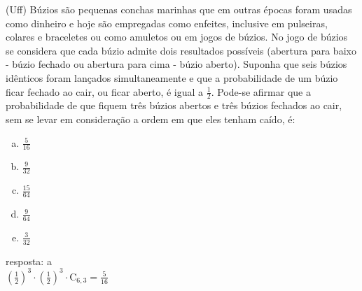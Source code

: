 \begin{ex}
 (Uff) Búzios são pequenas conchas marinhas   que     em outras épocas foram usadas como dinheiro e hoje são empregadas como enfeites, inclusive em pulseiras, colares e braceletes ou como amuletos ou em jogos de búzios. No jogo de búzios se considera que cada búzio admite dois resultados possíveis (abertura para baixo - búzio fechado ou abertura para cima - búzio aberto).
Suponha que seis búzios idênticos foram lançados simultaneamente e que a probabilidade de um búzio ficar fechado ao cair, ou ficar aberto, é igual a $\frac{1}{2}$.
Pode-se afirmar que a probabilidade de que fiquem três búzios abertos e três búzios fechados ao cair, sem se levar em consideração a ordem em que eles tenham caído, é:
    \begin{enumerate}[(a)]
    \item $\frac{5}{16}$
    \item $\frac{9}{32}$
    \item $\frac{15}{64}$
    \item $\frac{9}{64}$
    \item $\frac{3}{32}$
    \end{enumerate}
      \begin{sol}
      resposta: a  \\
      $(\frac{1}{2})^3\cdot(\frac{1}{2})^3\cdot\mathrm{C}_{6,3}=\frac{5}{16}$
      \end{sol}
\end{ex}